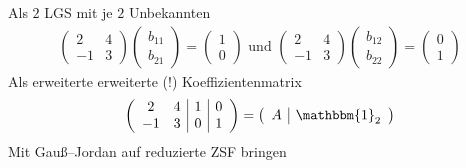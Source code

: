 Als $2$ LGS mit je $2$ Unbekannten
\begin{align*}
	\begin{pmatrix}2&4\\-1&3\end{pmatrix}\begin{pmatrix}b_{11}\\b_{21}\end{pmatrix} = \begin{pmatrix}1\\0\end{pmatrix}\text{ und }
	\begin{pmatrix}2&4\\-1&3\end{pmatrix}\begin{pmatrix}b_{12}\\b_{22}\end{pmatrix} = \begin{pmatrix}0\\1\end{pmatrix}
\end{align*}
Als erweiterte erweiterte (!) Koeffizientenmatrix
\begin{align*}
	\left(\begin{array}{cc|c|c}
		2 & 4 & 1 & 0 \\
		-1 & 3 & 0 & 1
	\end{array}\right) = \left(\begin{array}{c|c}A & \mathbbm{1}_2\end{array}\right)
\end{align*}
Mit Gauß--Jordan auf reduzierte ZSF bringen
